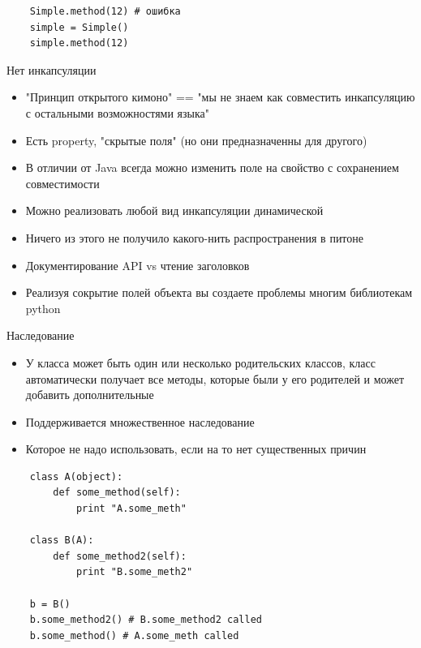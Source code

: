 \documentclass{article}
\begin{document}
\begin{lstlisting}
    Simple.method(12) # ошибка
    simple = Simple()
    simple.method(12)
\end{lstlisting}
\newpage

\begin{center} Нет инкапсуляции \end{center}
\begin{itemize}
    \item "Принцип открытого кимоно" == 
        "мы не знаем как совместить инкапсуляцию 
        с остальными возможностями языка"
    \item Есть property, "скрытые поля" (но они предназначенны для другого)
    \item В отличии от Java всегда можно изменить поле на свойство 
            с сохранением совместимости
    \item Можно реализовать любой вид инкапсуляции динамической
    \item Ничего из этого не получило какого-нить распространения в питоне
    \item Документирование API vs чтение заголовков
    \item Реализуя сокрытие полей объекта вы 
        создаете проблемы многим библиотекам python
\end{itemize}
\newpage

\begin{center} Наследование \end{center}
\begin{itemize}
    \item У класса может быть один или несколько родительских классов, 
          класс автоматически получает все методы, которые были у его родителей
          и может добавить дополнительные
    \item Поддерживается множественное наследование
    \item Которое не надо использовать, если на то нет существенных причин
\end{itemize}

{
\Large
\vspace{15pt}
\begin{lstlisting}
    class A(object):
        def some_method(self):
            print "A.some_meth"

    class B(A):
        def some_method2(self):
            print "B.some_meth2"

    b = B() 
    b.some_method2() # B.some_method2 called
    b.some_method() # A.some_meth called
\end{lstlisting}
}
\newpage
\end{document}
